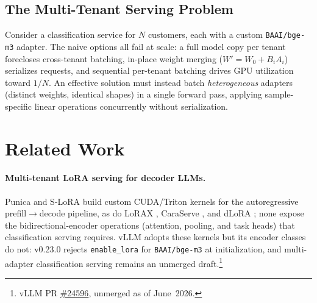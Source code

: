 \documentclass[11pt]{article}
\begin{document}
\subsection{The Multi-Tenant Serving Problem}
\label{sec:background_serving}

Consider a classification service for $N$ customers, each with a custom
\texttt{BAAI/bge-m3} adapter. The naive options all fail at
scale: a full model copy per tenant forecloses cross-tenant batching, in-place
weight merging ($W' = W_0 + B_i A_i$) serializes requests, and sequential
per-tenant batching drives GPU utilization toward $1/N$. An effective solution
must instead batch \emph{heterogeneous} adapters (distinct weights, identical
shapes) in a single forward pass, applying sample-specific linear operations
concurrently without serialization.

\section{Related Work}
\label{sec:relwork}

\paragraph{Multi-tenant LoRA serving for decoder LLMs.}
Punica \cite{chen2024punica} and S-LoRA \cite{sheng2024slora} build custom
CUDA/Triton kernels for the autoregressive prefill$\to$decode pipeline, as do
LoRAX \cite{predibase2023lorax}, CaraServe \cite{li2024caraserve}, and dLoRA
\cite{wu2024dlora}; none expose the bidirectional-encoder operations (attention,
pooling, and task heads) that classification serving requires. vLLM
\cite{kwon2023vllm} adopts these kernels but its encoder classes do not:
v0.23.0 rejects \texttt{enable\_lora} for \texttt{BAAI/bge-m3} at
initialization, and multi-adapter classification serving remains an unmerged
draft.\footnote{vLLM PR \href{https://github.com/vllm-project/vllm/pull/24596}{\#24596}, unmerged as of June~2026.}
\end{document}
